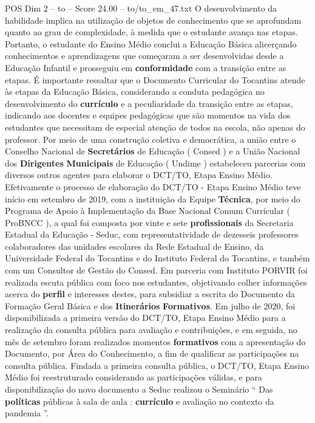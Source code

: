 \begin{textsample}{POS Dim 2 – to – Score 24.00 – to/to\_em\_47.txt}
O desenvolvimento da habilidade implica na utilização de objetos de conhecimento que se aprofundam quanto ao grau de complexidade, à medida que o estudante avança nas etapas.
Portanto, o estudante do Ensino Médio conclui a Educação Básica alicerçando conhecimentos e aprendizagens que começaram a ser desenvolvidas desde a Educação Infantil e prosseguiu em \textbf{conformidade} com a transição entre as etapas.
É importante ressaltar que o Documento Curricular do Tocantins atende às etapas da Educação Básica, considerando a conduta pedagógica no desenvolvimento do \textbf{currículo} e a peculiaridade da transição entre as etapas, indicando aos docentes e equipes pedagógicas que são momentos na vida dos estudantes que necessitam de especial atenção de todos na escola, não apenas do professor.
Por meio de uma construção coletiva e democrática, a união entre o Conselho Nacional de \textbf{Secretários} de Educação ( Consed ) e a União Nacional dos \textbf{Dirigentes} \textbf{Municipais} de Educação ( Undime ) estabeleceu parcerias com diversos outros agentes para elaborar o DCT/TO, Etapa Ensino Médio.
Efetivamente o processo de elaboração do DCT/TO - Etapa Ensino Médio teve início em setembro de 2019, com a instituição da Equipe \textbf{Técnica}, por meio do Programa de Apoio à Implementação da Base Nacional Comum Curricular ( ProBNCC ), a qual foi composta por vinte e sete \textbf{profissionais} da Secretaria Estadual da Educação - Seduc, com representatividade de dezesseis professores colaboradores das unidades escolares da Rede Estadual de Ensino, da Universidade Federal do Tocantins e do Instituto Federal do Tocantins, e também com um Consultor de Gestão do Consed.
Em parceria com Instituto PORVIR foi realizada escuta pública com foco nos estudantes, objetivando colher informações acerca do \textbf{perfil} e interesses destes, para subsidiar a escrita do Documento da Formação Geral Básica e dos \textbf{Itinerários} \textbf{Formativos}.
Em julho de 2020, foi disponibilizada a primeira versão do DCT/TO, Etapa Ensino Médio para a realização da consulta pública para avaliação e contribuições, e em seguida, no mês de setembro foram realizados momentos \textbf{formativos} com a apresentação do Documento, por Área do Conhecimento, a fim de qualificar as participações na consulta pública.
Findada a primeira consulta pública, o DCT/TO, Etapa Ensino Médio foi reestruturado considerando as participações válidas, e para disponibilização do novo documento a Seduc realizou o Seminário “ Das \textbf{políticas} públicas à sala de aula : \textbf{currículo} e avaliação no contexto da pandemia ”.

\end{textsample}
